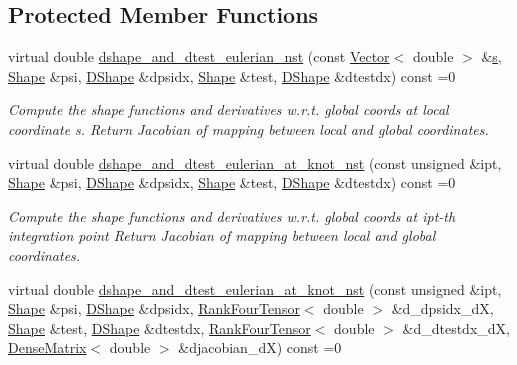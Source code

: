 \subsection*{Protected Member Functions}
\begin{DoxyCompactItemize}
\item 
virtual double \hyperlink{classoomph_1_1NavierStokesEquations_aeea4a1a3035ef93deaa68cc869e67dd8}{dshape\+\_\+and\+\_\+dtest\+\_\+eulerian\+\_\+nst} (const \hyperlink{classoomph_1_1Vector}{Vector}$<$ double $>$ \&\hyperlink{cfortran_8h_ab7123126e4885ef647dd9c6e3807a21c}{s}, \hyperlink{classoomph_1_1Shape}{Shape} \&psi, \hyperlink{classoomph_1_1DShape}{D\+Shape} \&dpsidx, \hyperlink{classoomph_1_1Shape}{Shape} \&test, \hyperlink{classoomph_1_1DShape}{D\+Shape} \&dtestdx) const =0
\begin{DoxyCompactList}\small\item\em Compute the shape functions and derivatives w.\+r.\+t. global coords at local coordinate s. Return Jacobian of mapping between local and global coordinates. \end{DoxyCompactList}\item 
virtual double \hyperlink{classoomph_1_1NavierStokesEquations_a46f9c15f162160fab6419f60ef619916}{dshape\+\_\+and\+\_\+dtest\+\_\+eulerian\+\_\+at\+\_\+knot\+\_\+nst} (const unsigned \&ipt, \hyperlink{classoomph_1_1Shape}{Shape} \&psi, \hyperlink{classoomph_1_1DShape}{D\+Shape} \&dpsidx, \hyperlink{classoomph_1_1Shape}{Shape} \&test, \hyperlink{classoomph_1_1DShape}{D\+Shape} \&dtestdx) const =0
\begin{DoxyCompactList}\small\item\em Compute the shape functions and derivatives w.\+r.\+t. global coords at ipt-\/th integration point Return Jacobian of mapping between local and global coordinates. \end{DoxyCompactList}\item 
virtual double \hyperlink{classoomph_1_1NavierStokesEquations_afbc63afd804f5143c74b0ca1be76ef82}{dshape\+\_\+and\+\_\+dtest\+\_\+eulerian\+\_\+at\+\_\+knot\+\_\+nst} (const unsigned \&ipt, \hyperlink{classoomph_1_1Shape}{Shape} \&psi, \hyperlink{classoomph_1_1DShape}{D\+Shape} \&dpsidx, \hyperlink{classoomph_1_1RankFourTensor}{Rank\+Four\+Tensor}$<$ double $>$ \&d\+\_\+dpsidx\+\_\+dX, \hyperlink{classoomph_1_1Shape}{Shape} \&test, \hyperlink{classoomph_1_1DShape}{D\+Shape} \&dtestdx, \hyperlink{classoomph_1_1RankFourTensor}{Rank\+Four\+Tensor}$<$ double $>$ \&d\+\_\+dtestdx\+\_\+dX, \hyperlink{classoomph_1_1DenseMatrix}{Dense\+Matrix}$<$ double $>$ \&djacobian\+\_\+dX) const =0

\end{DoxyCompactItemize}
